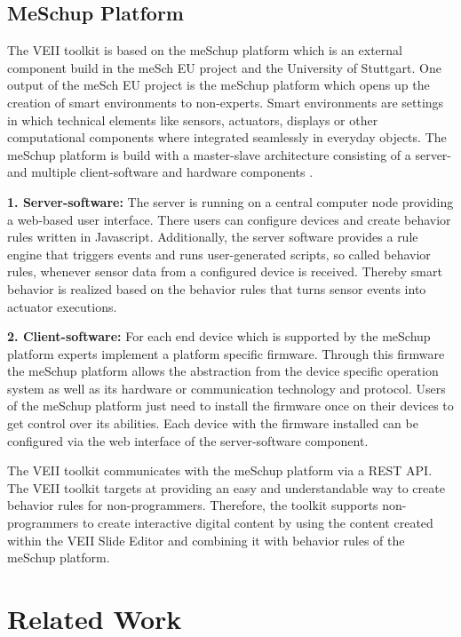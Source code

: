 \section{MeSchup Platform}
\label{sec:meschplatform}

The VEII toolkit is based on the meSchup platform which is an external component build in the meSch EU project and the University of Stuttgart. One output of the meSch EU project is the meSchup platform which opens up the creation of smart environments to non-experts. Smart environments are settings in which technical elements like sensors, actuators, displays or other computational components where integrated seamlessly in everyday objects. The meSchup platform is build with a master-slave architecture consisting of a server- and multiple client-software and hardware components \cite{Kubitza2015n}. 

\textbf{1. Server-software:}
\newline
The server is running on a central computer node providing a web-based user interface. There users can configure devices and create behavior rules written in Javascript. Additionally, the server software provides a rule engine that triggers events and runs user-generated scripts, so called behavior rules, whenever sensor data from a configured device is received. Thereby smart behavior is realized based on the behavior rules that turns sensor events into actuator executions. 

\textbf{2. Client-software:}
\newline
For each end device which is supported by the meSchup platform experts implement a platform specific firmware. Through this firmware the meSchup platform allows the abstraction from the device specific operation system as well as its hardware or communication technology and protocol. Users of the meSchup platform just need to install the firmware once on their devices to get control over its abilities. Each device with the firmware installed can be configured via the web interface of the server-software component.

The VEII toolkit communicates with the meSchup platform via a REST API. The VEII toolkit targets at providing an easy and understandable way to create behavior rules for non-programmers. Therefore, the toolkit supports non-programmers to create interactive digital content by using the content created within the VEII Slide Editor and combining it with behavior rules of the meSchup platform.

\chapter{Related Work}
\label{chap:relwork}

